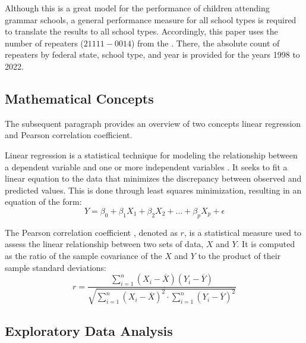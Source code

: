 Although this is a great model for the performance of children attending grammar schools, a general performance measure for all school types is required to translate the results to all school types. Accordingly, this paper uses the number of repeaters (\href{https://www-genesis.destatis.de/genesis//online?operation=table&code=21111-0014&bypass=true&levelindex=0&levelid=1706352887288#abreadcrumb}{$21111-0014$}) from the \citeauthor{statistische_bundesamt_statistisches_2024}. There, the absolute count of repeaters by federal state, school type, and year is provided for the years 1998 to 2022.

\subsection{Mathematical Concepts}
The subsequent paragraph provides an overview of two concepts linear regression and Pearson correlation coefficient.

Linear regression is a statistical technique for modeling the relationship between a dependent variable and one or more independent variables \cite{james_introduction_2021}. It seeks to fit a linear equation to the data that minimizes the discrepancy between observed and predicted values. This is done through least squares minimization, resulting in an equation of the form:
\begin{equation}
    Y = \beta_0 + \beta_1 X_1 + \beta_2 X_2 +  ...+ \beta_p X_p + \epsilon 
\end{equation}

The Pearson correlation coefficient \cite{rodgers_thirteen_1988}, denoted as $r$, is a statistical measure used to assess the linear relationship between two sets of data, $X$ and $Y$. It is computed as the ratio of the sample covariance of the $X$ and $Y$ to the product of their sample standard deviations:
\begin{equation}
    r = \frac{\sum_{i=1}^n (X_i - \overline{X}) (Y_i - \overline{Y})}{\sqrt{\sum_{i=1}^n(X_i-\overline{X})^2 \cdot \sum_{i=1}^n(Y_i-\overline{Y})^2}}
\end{equation}


\subsection{Exploratory Data Analysis}

